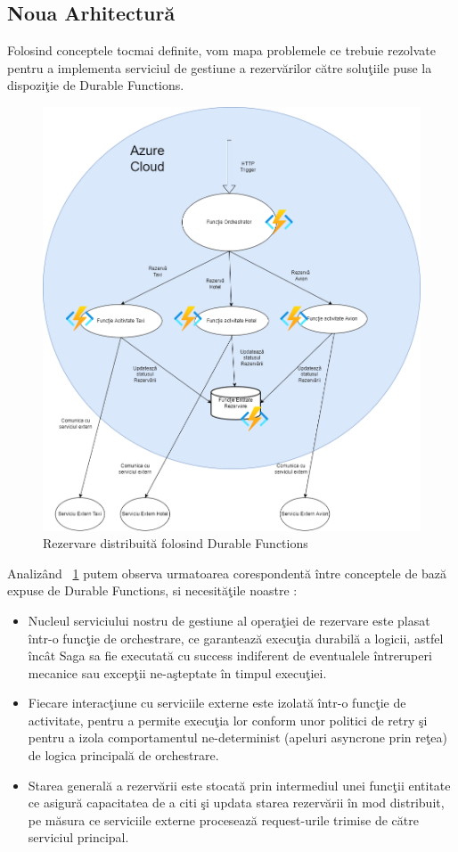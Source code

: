 \documentclass[a4paper,12pt]{report}
\begin{document}
\subsection{Noua Arhitectură}
\par Folosind conceptele tocmai definite, vom mapa problemele ce trebuie rezolvate pentru a implementa serviciul de gestiune a rezervărilor către soluţiile puse la dispoziţie de Durable Functions. 
 \begin{figure}[h]
\centering
        \includegraphics[width=1\textwidth]{images/durable_functions_arhitecture}
			 \caption{Rezervare distribuită folosind Durable Functions}
			 \label{fig:durable-functions-booking-arhitecture}
\end{figure}
 \par Analizând ~\ref{fig:durable-functions-booking-arhitecture} putem observa urmatoarea corespondentă între conceptele de bază expuse de Durable Functions, si necesităţile noastre : 
 \begin{itemize}
 \item Nucleul serviciului nostru de gestiune al operaţiei de rezervare este plasat într-o funcţie de orchestrare, ce garantează execuţia durabilă a logicii, astfel încât Saga sa fie executată cu success indiferent de eventualele întreruperi mecanice sau excepţii ne-aşteptate în timpul execuţiei.
 \item Fiecare interacţiune cu serviciile externe este izolată într-o funcţie de activitate, pentru a permite execuţia lor conform unor politici de retry şi pentru a izola comportamentul ne-determinist (apeluri asyncrone prin reţea) de logica principală de orchestrare.
 \item Starea generală a rezervării este stocată prin intermediul unei funcţii entitate ce asigură capacitatea de a citi şi updata starea rezervării în mod distribuit, pe măsura ce serviciile externe procesează request-urile trimise de către serviciul principal.
 \end{itemize}
\end{document}
